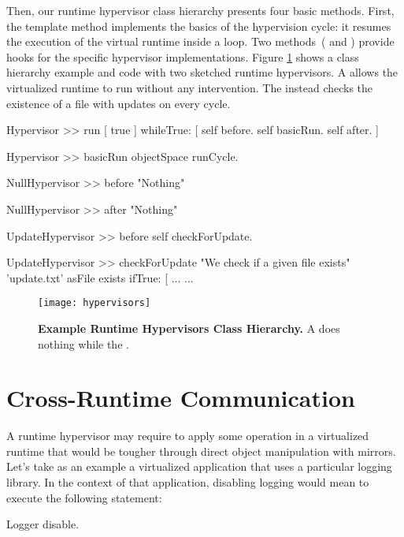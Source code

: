 Then, our runtime hypervisor class hierarchy presents four basic methods. First, the  template method implements the basics of the hypervision cycle: it resumes the execution of the virtual runtime inside a loop. Two methods~( and ) provide hooks for the specific hypervisor implementations. Figure \ref{fig:hypervisors} shows a class hierarchy example and code with two sketched runtime hypervisors. A  allows the virtualized runtime to run without any intervention. The  instead checks the existence of a file with updates on every cycle.

\begin{code}
Hypervisor >> run
    [ true ] whileTrue: [
        self before.
        self basicRun.
        self after.
    ]

Hypervisor >> basicRun
    objectSpace runCycle.

NullHypervisor >> before
    "Nothing"

NullHypervisor >> after
    "Nothing"

UpdateHypervisor >> before
    self checkForUpdate.

UpdateHypervisor >> checkForUpdate
    "We check if a given file exists"
    'update.txt' asFile exists ifTrue: [ ...
    ...
\end{code}

\begin{figure}[ht]
\center
\texttt{[image: hypervisors]}
\caption{\textbf{Example Runtime Hypervisors Class Hierarchy.} A  does nothing while the .\label{fig:hypervisors}}
\end{figure}

\section{Cross-Runtime Communication} \label{sec:communication}\label{sec:isolation}

A runtime hypervisor may require to apply some operation in a virtualized runtime that would be tougher through direct object manipulation with mirrors. Let's take as an example a virtualized application that uses a particular logging library. In the context of that application, disabling logging would mean to execute the following statement:

\begin{code}
Logger disable.
\end{code}

